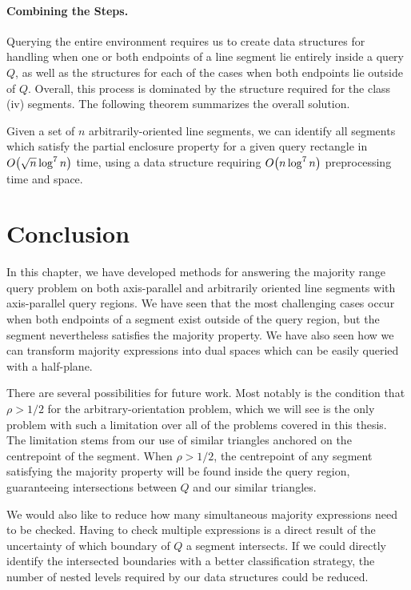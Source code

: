\paragraph{Combining the Steps.} 

Querying the entire environment requires us to create data structures for handling when one or both endpoints of a line segment lie entirely inside a query $Q$, as well as the structures for each of the cases when both endpoints lie outside of $Q$. Overall, this process is dominated by the structure required for the class (iv) segments. The following theorem summarizes the overall solution.

\begin{theorem}
\label{th:ao}
Given a set of $n$ arbitrarily-oriented line segments, we can identify all segments which satisfy the partial enclosure property for a given query rectangle in $O\!\left(\sqrt{n}\log^7{n}\right)$ time, using a data structure requiring $O\!\left(n\log^7{n}\right)$ preprocessing time and space.
\end{theorem}


\section{Conclusion}
\label{:rectangles:concl}

In this chapter, we have developed methods for answering the majority range query problem on both axis-parallel and arbitrarily oriented line segments with axis-parallel query regions. 
We have seen that the most challenging cases occur when both endpoints of a segment exist outside of the query region, but the segment nevertheless satisfies the majority property.  
We have also seen how we can transform majority expressions into dual spaces which can be easily queried with a half-plane.

There are several possibilities for future work.
Most notably is the condition that $\rho > 1/2$ for the arbitrary-orientation problem, which we will see is the only problem with such a limitation over all of the problems covered in this thesis.
The limitation stems from our use of similar triangles anchored on the centrepoint of the segment.
When $\rho > 1/2$, the centrepoint of any segment satisfying the majority property will be found inside the query region, guaranteeing intersections between $Q$ and our similar triangles.

We would also like to reduce how many simultaneous majority expressions need to be checked. Having to check multiple expressions is a direct result of the uncertainty of which boundary of $Q$ a segment intersects. If we could directly identify the intersected boundaries with a better classification strategy, the number of nested levels required by our data structures could be reduced.

